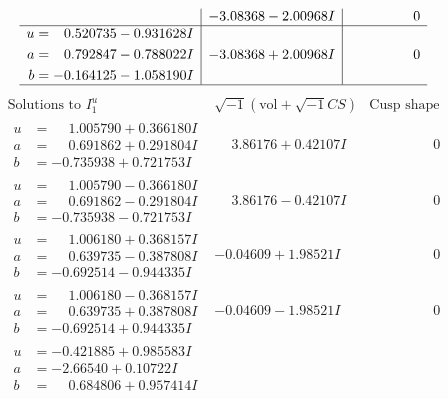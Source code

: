 \documentclass[1p]{elsarticle_modified}
\theoremstyle{definition}
\newcommand{\I}{\sqrt{-1}}
\begin{document}
$$\begin{array}{c|c|c}
 & -3.08368 - 2.00968 I & \phantom{-0.000000 } 0 \\ \hline\begin{aligned}
u &= \phantom{-}0.520735 - 0.931628 I \\
a &= \phantom{-}0.792847 - 0.788022 I \\
b &= -0.164125 - 1.058190 I\end{aligned}
 & -3.08368 + 2.00968 I & \phantom{-0.000000 } 0\\
 \hline 
 \end{array}$$\newpage$$\begin{array}{c|c|c}  
\text{Solutions to }I^u_{1}& \I (\text{vol} + \sqrt{-1}CS) & \text{Cusp shape}\\
 \hline 
\begin{aligned}
u &= \phantom{-}1.005790 + 0.366180 I \\
a &= \phantom{-}0.691862 + 0.291804 I \\
b &= -0.735938 + 0.721753 I\end{aligned}
 & \phantom{-}3.86176 + 0.42107 I & \phantom{-0.000000 } 0 \\ \hline\begin{aligned}
u &= \phantom{-}1.005790 - 0.366180 I \\
a &= \phantom{-}0.691862 - 0.291804 I \\
b &= -0.735938 - 0.721753 I\end{aligned}
 & \phantom{-}3.86176 - 0.42107 I & \phantom{-0.000000 } 0 \\ \hline\begin{aligned}
u &= \phantom{-}1.006180 + 0.368157 I \\
a &= \phantom{-}0.639735 - 0.387808 I \\
b &= -0.692514 - 0.944335 I\end{aligned}
 & -0.04609 + 1.98521 I & \phantom{-0.000000 } 0 \\ \hline\begin{aligned}
u &= \phantom{-}1.006180 - 0.368157 I \\
a &= \phantom{-}0.639735 + 0.387808 I \\
b &= -0.692514 + 0.944335 I\end{aligned}
 & -0.04609 - 1.98521 I & \phantom{-0.000000 } 0 \\ \hline\begin{aligned}
u &= -0.421885 + 0.985583 I \\
a &= -2.66540 + 0.10722 I \\
b &= \phantom{-}0.684806 + 0.957414 I\end{aligned}

\end{array}$$
\end{document}
